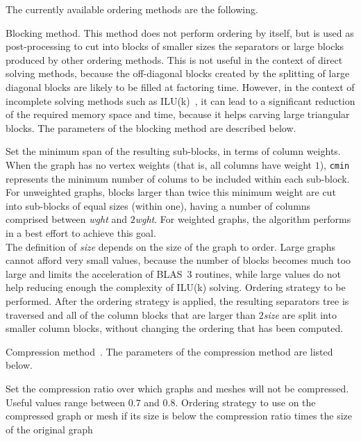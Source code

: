 The currently available ordering methods are the following.
\begin{itemize}
\iteme[{\tt b}]
Blocking method. This method does not perform ordering by itself, but
is used as post-processing to cut into blocks of smaller sizes the
separators or large blocks produced by other ordering methods. This is
not useful in the context of direct solving methods, because the
off-diagonal blocks created by the splitting of large diagonal blocks
are likely to be filled at factoring time. However, in the context of
incomplete solving methods such as ILU(k)~\cite{heperaro04a}, it can
lead to a significant reduction of the required memory space and time,
because it helps carving large triangular blocks.
The parameters of the blocking method are described below.
\begin{itemize}
\iteme[{\tt cmin=}{\it wght}]
Set the minimum span of the resulting sub-blocks, in terms of column
weights. When the graph has no vertex weights (that is, all columns
have weight $1$), \texttt{cmin} represents the minimum number of
colums to be included within each sub-block.
For unweighted graphs, blocks larger than twice this minimum weight
are cut into sub-blocks of equal sizes (within one), having a number
of columns comprised between {\it wght} and $2${\it wght}. For
weighted graphs, the algorithm performs in a best effort to achieve
this goal.
\\
The definition of {\it size} depends on the size of the graph
to order. Large graphs cannot afford very small values, because the
number of blocks becomes much too large and limits the acceleration
of BLAS~3 routines, while large values do not help reducing enough
the complexity of ILU(k) solving.
\iteme[{\tt strat=}{\it strat}]
Ordering strategy to be performed. After the ordering strategy is
applied, the resulting separators tree is traversed and all of the
column blocks that are larger than $2${\it size} are split into
smaller column blocks, without changing the ordering that has been
computed.
\end{itemize}
\iteme[{\tt c}]
\label{sec-lib-meth-compress}
Compression method~\cite{ashc95}.
The parameters of the compression method are listed below.
\begin{itemize}
\iteme[{\tt rat=}{\it rat}]
Set the compression ratio over which graphs and meshes will not be
compressed. Useful values range between $0.7$ and $0.8$.
\iteme[{\tt cpr=}{\it strat}]
Ordering strategy to use on the compressed graph or mesh if its size
is below the compression ratio times the size of the original graph

\end{itemize}
\end{itemize}
